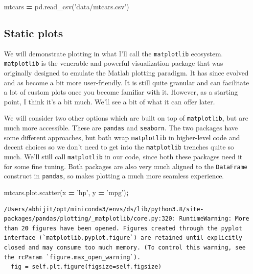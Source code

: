 \documentclass[
  letterpaper,
]{scrbook}
\newenvironment{Shaded}{\begin{snugshade}}{\end{snugshade}}
\newcommand{\NormalTok}[1]{#1}
\newcommand{\OperatorTok}[1]{\textcolor[rgb]{0.81,0.36,0.00}{\textbf{#1}}}
\newcommand{\StringTok}[1]{\textcolor[rgb]{0.31,0.60,0.02}{#1}}
\begin{document}
\begin{Shaded}
\begin{Highlighting}[]
\NormalTok{mtcars }\OperatorTok{=}\NormalTok{ pd.read_csv(}\StringTok{'data/mtcars.csv'}\NormalTok{)}
\end{Highlighting}
\end{Shaded}

\hypertarget{static-plots}{%
\subsection{Static plots}\label{static-plots}}

We will demonstrate plotting in what I'll call the \texttt{matplotlib} ecosystem. \texttt{matplotlib} is the venerable and powerful visualization package that was originally designed to emulate the Matlab plotting paradigm. It has since evolved and as become a bit more user-friendly. It is still quite granular and can facilitate a lot of custom plots once you become familiar with it. However, as a starting point, I think it's a bit much. We'll see a bit of what it can offer later.

We will consider two other options which are built on top of \texttt{matplotlib}, but are much more accessible. These are \texttt{pandas} and \texttt{seaborn}. The two packages have some different approaches, but both wrap \texttt{matplotlib} in higher-level code and decent choices so we don't need to get into the \texttt{matplotlib} trenches quite so much. We'll still call \texttt{matplotlib} in our code, since both these packages need it for some fine tuning. Both packages are also very much aligned to the \texttt{DataFrame} construct in \texttt{pandas}, so makes plotting a much more seamless experience.

\begin{Shaded}
\begin{Highlighting}[]
\NormalTok{mtcars.plot.scatter(x }\OperatorTok{=} \StringTok{'hp'}\NormalTok{, y }\OperatorTok{=} \StringTok{'mpg'}\NormalTok{)}\OperatorTok{;}
\end{Highlighting}
\end{Shaded}

\begin{verbatim}
/Users/abhijit/opt/miniconda3/envs/ds/lib/python3.8/site-packages/pandas/plotting/_matplotlib/core.py:320: RuntimeWarning: More than 20 figures have been opened. Figures created through the pyplot interface (`matplotlib.pyplot.figure`) are retained until explicitly closed and may consume too much memory. (To control this warning, see the rcParam `figure.max_open_warning`).
  fig = self.plt.figure(figsize=self.figsize)
\end{verbatim}
\end{document}
